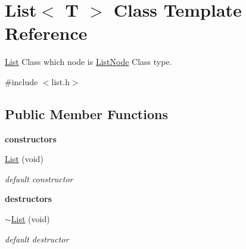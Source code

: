 \hypertarget{class_list}{\section{List$<$ T $>$ Class Template Reference}
\label{class_list}
}


\hyperlink{class_list}{List} Class which node is \hyperlink{class_list_node}{List\-Node} Class type.  




{\ttfamily \#include $<$list.\-h$>$}

\subsection*{Public Member Functions}
\begin{Indent}{\bf constructors}\par
\begin{DoxyCompactItemize}
\item 
\hyperlink{class_list_ae6a4229e888486c01c669894c5da20d9}{List} (void)
\begin{DoxyCompactList}\small\item\em default constructor \end{DoxyCompactList}\end{DoxyCompactItemize}
\end{Indent}
\begin{Indent}{\bf destructors}\par
\begin{DoxyCompactItemize}
\item 
\hyperlink{class_list_a9ecd03e07c7d1555de8c709f7b438097}{$\sim$\-List} (void)
\begin{DoxyCompactList}\small\item\em default destructor \end{DoxyCompactList}\end{DoxyCompactItemize}
\end{Indent}
